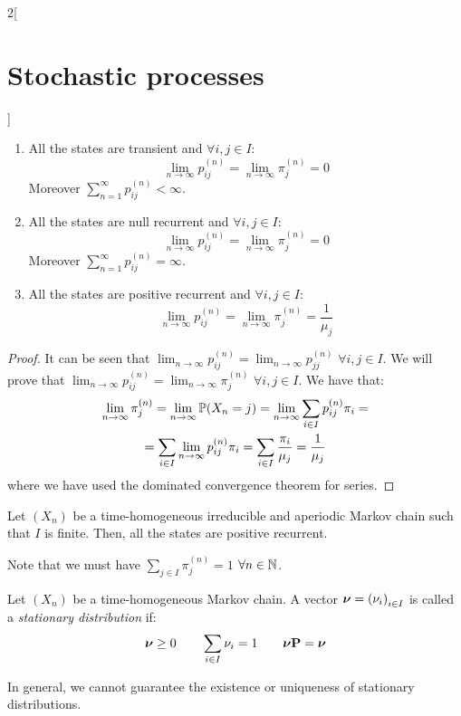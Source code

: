 \documentclass[../../../main_math.tex]{subfiles}
\begin{document}
\begin{multicols}{2}[\section{Stochastic processes}]
\begin{theorem}
    \begin{enumerate}
      \item All the states are transient and $\forall i,j\in I$: $$\lim_{n\to\infty} p_{ij}^{(n)}=\lim_{n\to\infty} \pi_j^{(n)}=0$$ Moreover $\sum_{n=1}^\infty p_{ij}^{(n)}<\infty$.
      \item All the states are null recurrent and $\forall i,j\in I$: $$\lim_{n\to\infty} p_{ij}^{(n)}=\lim_{n\to\infty} \pi_j^{(n)}=0$$ Moreover $\sum_{n=1}^\infty p_{ij}^{(n)}=\infty$.
      \item All the states are positive recurrent and $\forall i,j\in I$: $$\lim_{n\to\infty} p_{ij}^{(n)}=\lim_{n\to\infty} \pi_j^{(n)}=\frac{1}{\mu_j}$$
    \end{enumerate}
  \end{theorem}
  \begin{proof}
    It can be seen that $\displaystyle\lim_{n\to\infty}p_{ij}^{(n)}=\lim_{n\to\infty} p_{jj}^{(n)}$ $\forall i, j\in I$. We will prove that $\displaystyle\lim_{n\to\infty}p_{ij}^{(n)}=\lim_{n\to\infty} \pi_j^{(n)}$ $\forall i, j\in I$. We have that:
    \begin{multline*}
      \lim_{n\to\infty}\pi_j^{(n)}=\lim_{n\to\infty}\mathbb{P}(X_n=j)=\lim_{n\to\infty}\sum_{i\in I}p_{ij}^{(n)}\pi_i=\\=\sum_{i\in I}\lim_{n\to\infty}p_{ij}^{(n)}\pi_i=\sum_{i\in I}\frac{\pi_i}{\mu_j}=\frac{1}{\mu_j}
    \end{multline*}
    where we have used the dominated convergence theorem for series.
  \end{proof}
  \begin{corollary}\label{SP:coroClassificationStates}
    Let $(X_n)$ be a time-homogeneous irreducible and aperiodic Markov chain such that $I$ is finite. Then, all the states are positive recurrent.
  \end{corollary}
  \begin{sproof}
    Note that we must have $\sum_{j\in I}\pi_j^{(n)}=1$ $\forall n\in\mathbb{N}$.
  \end{sproof}
  \begin{definition}
    Let $(X_n)$ be a time-homogeneous Markov chain. A vector $\boldsymbol{\mathrm{\nu}}={(\nu_i)}_{i\in I}$ is called a \emph{stationary distribution} if:
    $$
      \boldsymbol{\mathrm{\nu}}\geq 0\qquad\sum_{i\in I}\nu_i=1\qquad\boldsymbol{\mathrm{\nu}}\boldsymbol{\mathrm{P}}=\boldsymbol{\mathrm{\nu}}
    $$
  \end{definition}
  \begin{remark}
    In general, we cannot guarantee the existence or uniqueness of stationary distributions.

\end{remark}
\end{multicols}
\end{document}
